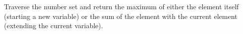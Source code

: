 \documentclass[preview]{standalone}
\begin{document}
Traverse the number set and return the maximum of either the element itself (starting a new variable) or the sum of the element with the current element (extending the current variable).\\
\end{document}
